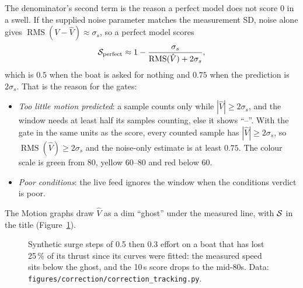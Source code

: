 The denominator's second term is the reason a perfect model does not score $0$ in
a swell. If the supplied noise parameter matches the measurement SD, noise alone gives $\operatorname{RMS}(V - \hat V) \approx \sigma_{s}$, so
a perfect model scores
\[
  \mathcal{S}_{\text{perfect}} \approx 1 - \frac{\sigma_{s}}{\operatorname{RMS}(\hat V) + 2\sigma_{s}},
\]
which is $0.5$ when the boat is asked for nothing and $0.75$ when the prediction is
$2\sigma_{s}$. That is the reason for the gates:
\begin{itemize}[nosep]
  \item \emph{Too little motion predicted}: a sample counts only while
        $|\hat V| \ge 2\sigma_{s}$, and the window needs at least half its samples
        counting, else it shows ``--''. With
        the gate in the same units as the score, every counted sample has
        $|\hat V| \ge 2\sigma_{s}$, so $\operatorname{RMS}(\hat V) \ge 2\sigma_{s}$
        and the noise-only estimate is at least $0.75$. The colour scale is
        green from 80, yellow 60--80 and red below 60.
  \item \emph{Poor conditions}: the live feed ignores the window when the
        conditions verdict is poor.
\end{itemize}
The Motion graphs draw $\hat V$ as a dim ``ghost'' under the measured line, with
$\mathcal{S}$ in the title (Figure~\ref{fig:corr-ghost}).

\begin{figure}[htbp]
\centering
{}
\caption{Synthetic surge steps of 0.5 then 0.3 effort on a boat that has lost 25\,\% of its
thrust since its curves were fitted: the measured speed sits below the ghost, and
the 10\,s score drops to the mid-80s. Data: \texttt{figures/correction/correction\_tracking.py}.}
\label{fig:corr-ghost}
\end{figure}

